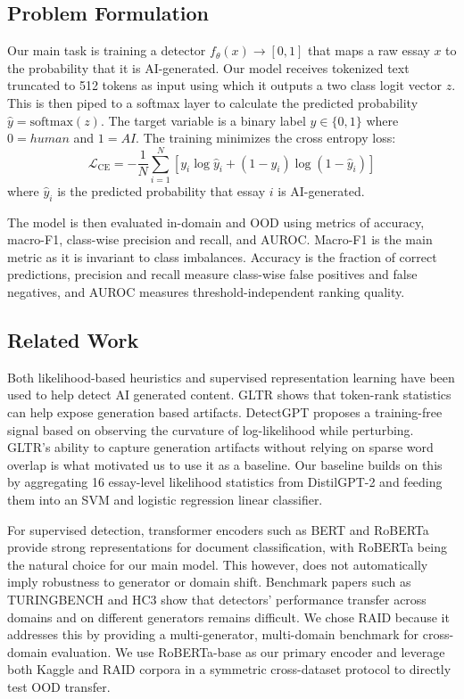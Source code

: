 \documentclass{article}
\begin{document}
\subsection{Problem Formulation}
Our main task is training a detector $f_\theta(x) \rightarrow [0,1]$ that maps a raw essay $x$ to the probability that it is AI-generated. Our model receives tokenized text truncated to 512 tokens as input using which it outputs a two class logit vector $z$. This is then piped to a softmax layer to calculate the predicted probability $\hat{y} = \mathrm{softmax}(z)$. The target variable is a binary label $y \in \{0,1\}$ where $0=human$ and $1=AI$. The training minimizes the cross entropy loss:
\begin{equation}
    \mathcal{L}_{\text{CE}} = -\frac{1}{N}\sum_{i=1}^{N}\left[y_i \log \hat{y}_i
        + (1 - y_i)\log(1 - \hat{y}_i)\right]
    \label{eq:ce}
\end{equation}
where $\hat{y}_i$ is the predicted probability that essay $i$ is
AI-generated.

The model is then evaluated in-domain and OOD using metrics of accuracy, macro-F1, class-wise precision and recall, and AUROC. Macro-F1 is the main metric as it is invariant to class imbalances. Accuracy is the fraction of correct predictions, precision and recall measure class-wise false positives and false negatives, and AUROC measures threshold-independent ranking quality.

\subsection{Related Work}
Both likelihood-based
heuristics and supervised representation learning have been used to help detect AI generated content. GLTR \citep{gehrmann2019gltr} shows that token-rank statistics can help expose generation based artifacts. DetectGPT
\citep{mitchell2023detectgpt} proposes a training-free signal based on observing the
curvature of log-likelihood while perturbing. GLTR's ability to capture generation artifacts without relying on sparse word overlap is what motivated us to use it as a baseline. Our baseline builds on
this by aggregating 16 essay-level likelihood statistics from
DistilGPT-2 and feeding them into an SVM and logistic regression linear classifier.

For supervised detection, transformer encoders such as BERT
\citep{devlin2019bert} and RoBERTa \citep{liu2019roberta} provide
strong representations for document classification, with RoBERTa being
the natural choice for our main model. This
however, does not automatically imply robustness to generator or
domain shift. Benchmark papers such as TURINGBENCH \citep{uchendu2021turingbench} and HC3 \citep{guo2023close} show that
detectors' performance transfer across domains and on different generators remains difficult. We chose RAID \citep{dugan2024raid} because it addresses this by providing a multi-generator, multi-domain benchmark for cross-domain evaluation. We use RoBERTa-base as our primary encoder and leverage both Kaggle and RAID corpora in a symmetric cross-dataset protocol to
directly test OOD transfer.
\end{document}
